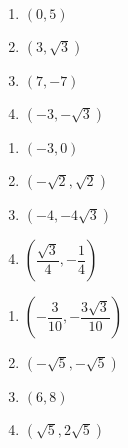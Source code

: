\documentclass{ximera}
\begin{document}
\begin{multicols}{4}

\begin{enumerate}

\setcounter{enumi}{\value{HW}}

\item $(0, 5)$ \label{recttopolarfirst} 
\item $(3, \sqrt{3})$
\item $(7, -7)$
\item $(-3, -\sqrt{3})$

\setcounter{HW}{\value{enumi}}

\end{enumerate}

\end{multicols}

\begin{multicols}{4} 

\begin{enumerate}

\setcounter{enumi}{\value{HW}}

\item $(-3, 0)$ 
\item $\left( -\sqrt{2}, \sqrt{2} \right)$ 
\item $\left( -4,-4\sqrt{3} \right)$ 
\item $\left( \dfrac{\sqrt{3}}{4}, -\dfrac{1}{4} \right)$

\setcounter{HW}{\value{enumi}}

\end{enumerate}

\end{multicols}

\begin{multicols}{4} 

\begin{enumerate}

\setcounter{enumi}{\value{HW}}

\item $\left( -\dfrac{3}{10}, -\dfrac{3\sqrt{3}}{10} \right)$
\item $\left( -\sqrt{5}, -\sqrt{5} \right)$ 
\item $(6,8)$ 
\item $(\sqrt{5},2\sqrt{5})$ 

\setcounter{HW}{\value{enumi}}

\end{enumerate}

\end{multicols}
\end{document}
